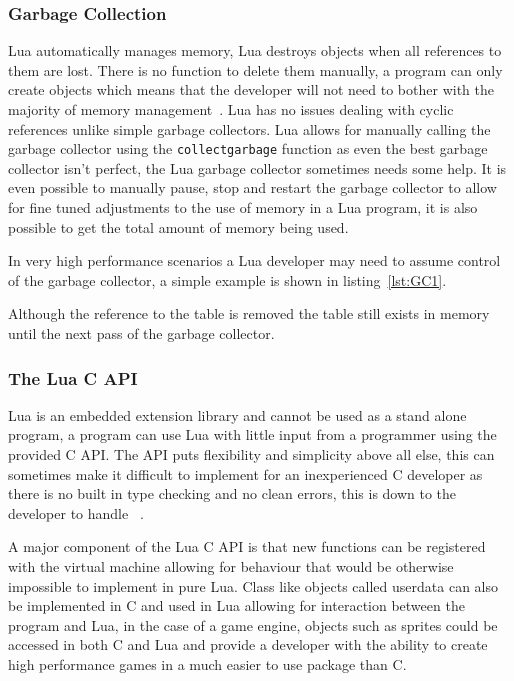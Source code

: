 \documentclass[11pt,a4paper,titlepage]{article}
\begin{document}
		\subsubsection{Garbage Collection}

			Lua automatically manages memory, Lua destroys objects when all references to them are lost. There is no function to delete them manually, a program can only create objects which means that the developer will not need to bother with the majority of memory management~\cite{Ierusalimschy:2013:PLT:2502646}. Lua has no issues dealing with cyclic references unlike simple garbage collectors. Lua allows for manually calling the garbage collector using the \texttt{collectgarbage} function as even the best garbage collector isn't perfect, the Lua garbage collector sometimes needs some help. It is even possible to manually pause, stop and restart the garbage collector to allow for fine tuned adjustments to the use of memory in a Lua program, it is also possible to get the total amount of memory being used.

			In very high performance scenarios a Lua developer may need to assume control of the garbage collector, a simple example is shown in listing~\ref{lst:GC1}.
			
			
			Although the reference to the table is removed the table still exists in memory until the next pass of the garbage collector.

		\subsubsection{The Lua C API}

			Lua is an embedded extension library and cannot be used as a stand alone program, a program can use Lua with little input from a programmer using the provided C API. The API puts flexibility and simplicity above all else, this can sometimes make it difficult to implement for an inexperienced C developer as there is no built in type checking and no clean errors, this is down to the developer to handle ~\cite{Ierusalimschy:2013:PLT:2502646}.

			A major component of the Lua C API is that new functions can be registered with the virtual machine allowing for behaviour that would be otherwise impossible to implement in pure Lua. Class like objects called userdata can also be implemented in C and used in Lua allowing for interaction between the program and Lua, in the case of a game engine, objects such as sprites could be accessed in both C and Lua and provide a developer with the ability to create high performance games in a much easier to use package than C.
\end{document}
